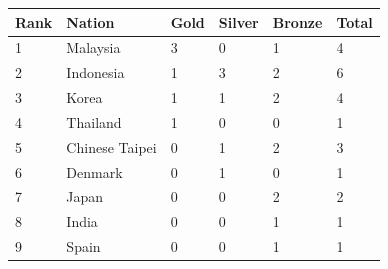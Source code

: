 \documentclass{article}
\begin{document}
\begin{tabular}{llllll}
\toprule
Rank & Nation & Gold & Silver & Bronze & Total \\
\midrule
1 & Malaysia & 3 & 0 & 1 & 4 \\
2 & Indonesia & 1 & 3 & 2 & 6 \\
3 & Korea & 1 & 1 & 2 & 4 \\
4 & Thailand & 1 & 0 & 0 & 1 \\
5 & Chinese Taipei & 0 & 1 & 2 & 3 \\
6 & Denmark & 0 & 1 & 0 & 1 \\
7 & Japan & 0 & 0 & 2 & 2 \\
8 & India & 0 & 0 & 1 & 1 \\
9 & Spain & 0 & 0 & 1 & 1 \\
\bottomrule
\end{tabular}
\end{document}
